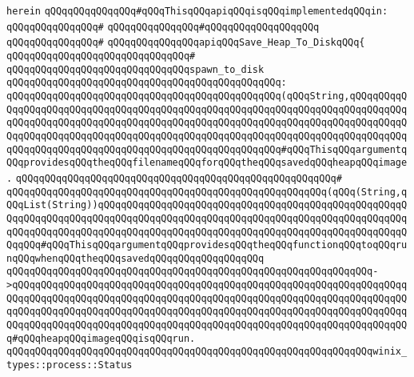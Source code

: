 \verb|herein|\newline
\newline
\verb|qQQqqQQqqQQqqQQq#qQQqThisqQQqapiqQQqisqQQqimplementedqQQqin:|\newline
\verb|qQQqqQQqqQQqqQQq#|\newline
\verb|qQQqqQQqqQQqqQQq#qQQqqQQqqQQqqQQqqQQq|\newline
\verb|qQQqqQQqqQQqqQQq#|\newline
\verb|qQQqqQQqqQQqqQQqapiqQQqSave_Heap_To_DiskqQQq{|\newline
\verb|qQQqqQQqqQQqqQQqqQQqqQQqqQQqqQQq#|\newline
\newline
\verb|qQQqqQQqqQQqqQQqqQQqqQQqqQQqqQQqspawn_to_disk|\newline
\verb|qQQqqQQqqQQqqQQqqQQqqQQqqQQqqQQqqQQqqQQqqQQqqQQq:|\newline
\verb|qQQqqQQqqQQqqQQqqQQqqQQqqQQqqQQqqQQqqQQqqQQqqQQq(qQQqString,qQQqqQQqqQQqqQQqqQQqqQQqqQQqqQQqqQQqqQQqqQQqqQQqqQQqqQQqqQQqqQQqqQQqqQQqqQQqqQQqqQQqqQQqqQQqqQQqqQQqqQQqqQQqqQQqqQQqqQQqqQQqqQQqqQQqqQQqqQQqqQQqqQQqqQQqqQQqqQQqqQQqqQQqqQQqqQQqqQQqqQQqqQQqqQQqqQQqqQQqqQQqqQQqqQQqqQQqqQQqqQQqqQQqqQQqqQQqqQQqqQQqqQQqqQQqqQQqqQQqqQQqqQQq#qQQqThisqQQqargumentqQQqprovidesqQQqtheqQQqfilenameqQQqforqQQqtheqQQqsavedqQQqheapqQQqimage.|\newline
\verb|qQQqqQQqqQQqqQQqqQQqqQQqqQQqqQQqqQQqqQQqqQQqqQQqqQQqqQQq#|\newline
\verb|qQQqqQQqqQQqqQQqqQQqqQQqqQQqqQQqqQQqqQQqqQQqqQQqqQQqqQQq(qQQq(String,qQQqList(String))qQQqqQQqqQQqqQQqqQQqqQQqqQQqqQQqqQQqqQQqqQQqqQQqqQQqqQQqqQQqqQQqqQQqqQQqqQQqqQQqqQQqqQQqqQQqqQQqqQQqqQQqqQQqqQQqqQQqqQQqqQQqqQQqqQQqqQQqqQQqqQQqqQQqqQQqqQQqqQQqqQQqqQQqqQQqqQQqqQQqqQQqqQQqqQQqqQQqqQQq#qQQqThisqQQqargumentqQQqprovidesqQQqtheqQQqfunctionqQQqtoqQQqrunqQQqwhenqQQqtheqQQqsavedqQQqqQQqqQQqqQQqqQQq|\newline
\verb|qQQqqQQqqQQqqQQqqQQqqQQqqQQqqQQqqQQqqQQqqQQqqQQqqQQqqQQqqQQqqQQq->qQQqqQQqqQQqqQQqqQQqqQQqqQQqqQQqqQQqqQQqqQQqqQQqqQQqqQQqqQQqqQQqqQQqqQQqqQQqqQQqqQQqqQQqqQQqqQQqqQQqqQQqqQQqqQQqqQQqqQQqqQQqqQQqqQQqqQQqqQQqqQQqqQQqqQQqqQQqqQQqqQQqqQQqqQQqqQQqqQQqqQQqqQQqqQQqqQQqqQQqqQQqqQQqqQQqqQQqqQQqqQQqqQQqqQQqqQQqqQQqqQQqqQQqqQQqqQQqqQQqqQQqqQQqqQQqqQQqqQQq#qQQqheapqQQqimageqQQqisqQQqrun.|\newline
\verb|qQQqqQQqqQQqqQQqqQQqqQQqqQQqqQQqqQQqqQQqqQQqqQQqqQQqqQQqqQQqqQQqwinix_types::process::Status|\newline

